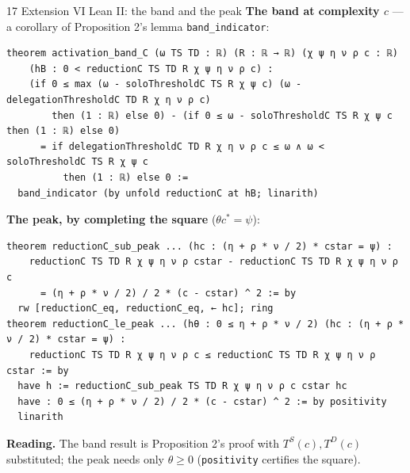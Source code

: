\documentclass[aspectratio=169,11pt]{beamer}
\begin{document}
\begin{frame}[fragile]{17 \textperiodcentered{} Extension VI \textperiodcentered{} Lean II: the band and the peak}
  \small\textbf{The band at complexity $c$} --- a corollary of Proposition 2's lemma \texttt{band\_indicator}:
\begin{lstlisting}
theorem activation_band_C (ω TS TD : ℝ) (R : ℝ → ℝ) (χ ψ η ν ρ c : ℝ)
    (hB : 0 < reductionC TS TD R χ ψ η ν ρ c) :
    (if 0 ≤ max (ω - soloThresholdC TS R χ ψ c) (ω - delegationThresholdC TD R χ η ν ρ c)
        then (1 : ℝ) else 0) - (if 0 ≤ ω - soloThresholdC TS R χ ψ c then (1 : ℝ) else 0)
      = if delegationThresholdC TD R χ η ν ρ c ≤ ω ∧ ω < soloThresholdC TS R χ ψ c
          then (1 : ℝ) else 0 :=
  band_indicator (by unfold reductionC at hB; linarith)
\end{lstlisting}
  \textbf{The peak, by completing the square} ($\theta c^*=\psi$):
\begin{lstlisting}
theorem reductionC_sub_peak ... (hc : (η + ρ * ν / 2) * cstar = ψ) :
    reductionC TS TD R χ ψ η ν ρ cstar - reductionC TS TD R χ ψ η ν ρ c
      = (η + ρ * ν / 2) / 2 * (c - cstar) ^ 2 := by
  rw [reductionC_eq, reductionC_eq, ← hc]; ring
theorem reductionC_le_peak ... (hθ : 0 ≤ η + ρ * ν / 2) (hc : (η + ρ * ν / 2) * cstar = ψ) :
    reductionC TS TD R χ ψ η ν ρ c ≤ reductionC TS TD R χ ψ η ν ρ cstar := by
  have h := reductionC_sub_peak TS TD R χ ψ η ν ρ c cstar hc
  have : 0 ≤ (η + ρ * ν / 2) / 2 * (c - cstar) ^ 2 := by positivity
  linarith
\end{lstlisting}
  \textbf{Reading.} The band result is Proposition 2's proof with $T^S(c),T^D(c)$ substituted; the peak needs
  only $\theta\ge 0$ (\texttt{positivity} certifies the square).
\end{frame}
\end{document}
